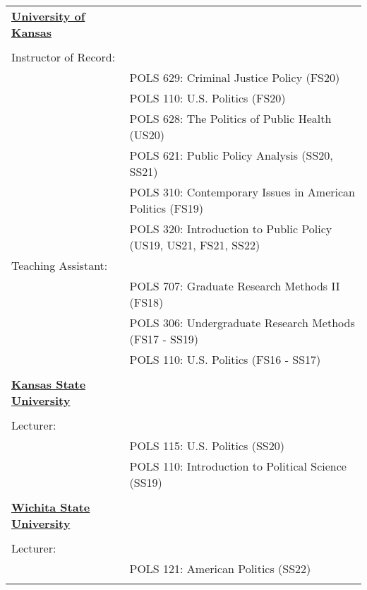 \documentclass[margin,line,pifont,palatino,courier]{res}
\begin{document}
\begin{resume}
\begin{tabular}{ll}
  \textbf{\underline{University of Kansas}} & \tabularnewline
  & \tabularnewline
    Instructor of Record: & \tabularnewline
  & POLS 629: Criminal Justice Policy (FS20)\tabularnewline
  & POLS 110: U.S. Politics (FS20)\tabularnewline
  & POLS 628: The Politics of Public Health (US20)\tabularnewline
  & POLS 621: Public Policy Analysis (SS20, SS21)\tabularnewline
  & POLS 310: Contemporary Issues in American Politics (FS19)\tabularnewline
  & POLS 320: Introduction to Public Policy (US19, US21, FS21, SS22)\tabularnewline
    Teaching Assistant: & \tabularnewline
  & POLS 707: Graduate Research Methods II (FS18)\tabularnewline
  & POLS 306: Undergraduate Research Methods (FS17 - SS19)\tabularnewline
  & POLS 110: U.S. Politics (FS16 - SS17)\tabularnewline
  & \tabularnewline
    \textbf{\underline{Kansas State University}} & \tabularnewline
  & \tabularnewline
    Lecturer: & \tabularnewline
  & POLS 115: U.S. Politics (SS20)\tabularnewline
  & POLS 110: Introduction to Political Science (SS19)\tabularnewline
  & \tabularnewline
    \textbf{\underline{Wichita State University}} & \tabularnewline
  & \tabularnewline
    Lecturer: & \tabularnewline
  & POLS 121: American Politics (SS22)\tabularnewline
  & \tabularnewline
\end{tabular}


\end{resume}
\end{document}
